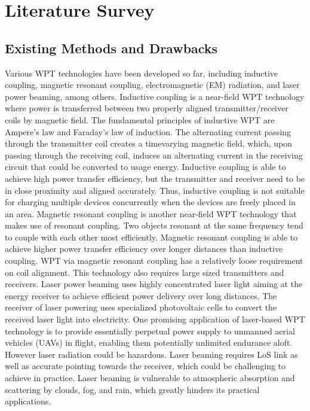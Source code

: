 \documentclass[hidelinks, 12pt]{report}
\begin{document}
\chapter{Literature Survey}
\section{Existing Methods and Drawbacks}
\justify
Various WPT technologies have been developed so far, including inductive coupling, magnetic resonant coupling, electromagnetic (EM) radiation, and laser power beaming, among others. 
Inductive coupling is a near-field WPT technology where power is transferred between two properly aligned transmitter/receiver coils by magnetic field. The fundamental principles of inductive WPT are Ampere’s law and Faraday’s law of induction. The alternating current passing through the transmitter coil creates a timevarying magnetic field, which, upon passing through the receiving coil, induces an alternating current in the receiving circuit that could be converted to usage energy. Inductive coupling is able to achieve high power transfer efficiency, but the transmitter and receiver need to be in close proximity and aligned accurately. Thus, inductive coupling is not suitable for charging multiple devices concurrently when the devices are freely placed in an area.
Magnetic resonant coupling is another near-field WPT technology that makes use of resonant coupling. Two objects resonant at the same frequency tend to couple with each other most efficiently. Magnetic resonant coupling is able to achieve higher power transfer efficiency over longer distances than inductive coupling. WPT via magnetic resonant coupling has a relatively loose requirement on coil alignment. This technology also requires large sized transmitters and receivers.
Laser power beaming uses highly concentrated laser light aiming at the energy receiver to achieve efficient power delivery over long distances. The receiver of laser powering uses specialized photovoltaic cells to convert the received laser light into electricity. One promising application of laser-based WPT technology is to provide essentially perpetual power supply to unmanned aerial vehicles (UAVs) in flight, enabling them potentially unlimited endurance aloft. However laser radiation could be hazardous. Laser beaming requires LoS link as well as accurate pointing towards the receiver, which could be challenging to achieve in practice. Laser beaming is vulnerable to atmospheric absorption and scattering by clouds, fog, and rain, which greatly hinders its practical applications.
\end{document}
